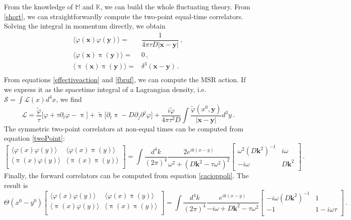 \documentclass[a4paper, amsfonts, amssymb, amsmath, reprint, showkeys, nofootinbib, twoside,notitlepage,onecolumn]{revtex4-2}
\newcommand{\Ma}{{\mathbb{M}}}
\newcommand{\Ka}{{\mathbb{K}}}
\newcommand{\x}{{\textbf{x}}}
\newcommand{\y}{{\textbf{y}}}
\newcommand{\kb}{{\textbf{k}}}
\theoremstyle{definition}
\begin{document}
From the knowledge of $\Ma$ and $\Ka$, we can build the whole fluctuating theory. From \eqref{short}, we can straightforwardly compute the two-point equal-time correlators. Solving the integral in momentum directly, we obtain
\begin{equation}\label{grzuzber}
    \begin{split}
 \langle \varphi(\x)\varphi(\y)\rangle ={}& \dfrac{1}{4\pi \tau D |\x -\y|}  \, , \\
 \langle \varphi(\x)\uppi(\y)\rangle ={}&  0 \, , \\
 \langle \uppi(\x)\uppi(\y)\rangle ={}& \delta^3(\x-\y)  \, . \\
    \end{split}
\end{equation}
From equations \eqref{effectiveaction} and \eqref{fbruf}, we can compute the MSR action. If we express it as the spacetime integral of a Lagrangian density, i.e. $\mathcal{S}=\int \mathcal{L}(x)d^4x$, we find
\begin{equation}\label{lagringa}
    \mathcal{L} = \dfrac{\tilde{\varphi}}{\tau} \big[\varphi+\tau \partial_t \varphi-\uppi\big] +\tilde{\uppi} \big[ \partial_t \uppi-D \partial_j \partial^j \varphi  \big] +\dfrac{i \tilde{\varphi}}{4\pi \tau^2 D}  \int  \dfrac{\tilde{\varphi}(x^0,\y)}{|\x -\y|} d^3 y \, .
\end{equation}
The symmetric two-point correlators at non-equal times can be computed from equation \eqref{twoPoint}:
\begin{equation}\label{nonGyzxiop}
     \begin{bmatrix}
      \langle \varphi(x) \varphi(y)\rangle & \langle \varphi(x) \uppi(y)\rangle  \\
      \langle \uppi(x) \varphi(y)\rangle  & \langle \uppi(x) \uppi(y)\rangle \\
     \end{bmatrix}  = \int \dfrac{d^4 k}{(2\pi)^4} \dfrac{ 2 e^{i k (x-y)} }{\omega^2{+}(D\kb^2 {-}\tau \omega^2)^2} 
     \begin{bmatrix}
        \omega^2(D\kb^2)^{-1} & i\omega \\
        -i\omega  & D\kb^2 \\ 
     \end{bmatrix}\, .
\end{equation}
Finally, the forward correlators can be computed from equation \eqref{cacioppoli}. The result is
\begin{equation}\label{inritardo}
\Theta(x^0{-}y^0)
     \begin{bmatrix} 
      \langle \varphi(x) \varphi(y)\rangle & \langle \varphi(x) \uppi(y)\rangle  \\
      \langle \uppi(x) \varphi(y)\rangle  & \langle \uppi(x) \uppi(y)\rangle \\
     \end{bmatrix}  = \int \dfrac{d^4 k}{(2\pi)^4} \dfrac{e^{i k (x-y)} }{-i\omega+D\kb^2-\tau \omega^2} 
     \begin{bmatrix}
        -i\omega(D\kb^2)^{-1} & 1 \\
        -1  & 1-i\omega \tau \\ 
     \end{bmatrix}\, .
\end{equation}
\end{document}
